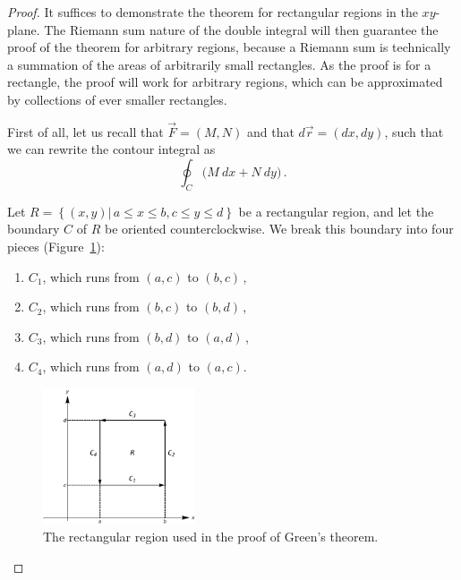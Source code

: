 \begin{proof}

It suffices to demonstrate the theorem for rectangular regions in the $xy$-plane. The Riemann sum nature of the double integral will then guarantee the proof of the theorem for arbitrary regions, because a Riemann sum is technically a summation of the areas of arbitrarily small rectangles. As the proof is for a rectangle, the proof will work for arbitrary regions, which can be approximated by collections of ever smaller rectangles. 

First of all, let us recall that $\vec F =\left( M,N\right)$ and that $d\vec r =(dx,dy)$, such that we can rewrite the contour integral as
$$
\oint_C \big(M\ dx + N\ dy\big)\,. 
$$


Let $R=\left\{(x,y)\left|\, a\leq x\leq b,c\leq y\leq d \right. \right\}$ be a rectangular region, and let the boundary $C$ of $R$ be oriented counterclockwise. We break this boundary into four pieces (Figure~\ref{fig_Vector_Calc_14}):
\begin{enumerate}
\item $C_1$, which runs from $(a,c)$ to $(b,c)$\,,  
\item $C_2$, which runs from $(b,c)$ to $(b,d)$\,, 
\item  $C_3$, which runs from $(b,d)$ to $(a,d)$\,, 
\item $C_4$, which runs from $(a,d)$ to $(a,c)$.
\end{enumerate}


\begin{figure}
	\begin{center}
			\includegraphics[width=0.4\textwidth]{fig_Vector_Calc_14}
	\caption{The rectangular region used in the proof of Green's theorem.}
	\label{fig_Vector_Calc_14}
	\end{center}
\end{figure}



\end{proof}
